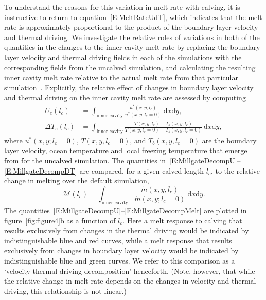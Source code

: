\documentclass[draft]{agujournal2019}
\begin{document}
To understand the reasons for this variation in melt rate with calving, it is instructive to return to equation~\eqref{E:MeltRateUdT}, which indicates that the melt rate is approximately proportional to the product of the boundary layer velocity and thermal driving. We investigate the relative roles of variations in both of the quantities in the changes to the inner cavity melt rate by replacing the boundary layer velocity and thermal driving fields in each of the simulations with the corresponding fields from the uncalved simulation, and calculating the resulting inner cavity melt rate relative to the actual melt rate from that particular simulation~\cite{Millgate2013JGROceans}. Explicitly, the relative effect of changes in boundary layer velocity and thermal driving on the inner cavity melt rate are assessed by computing
 \begin{align}
U_{e}(l_c) &=  \int_{\text{inner cavity}}\frac{u^*(x,y; l_c)}{u^*(x,y; l_c = 0)}~\mathrm{d}x\mathrm{d}y, \label{E:MillgateDecompU}\\ \Delta T_{e}(l_c) &= \int_{\text{inner cavity}}\frac{T(x,y; l_c) - T_b(x,y; l_c)}{T(x,y; l_c = 0) - T_{b}(x,y; l_c = 0)}~\mathrm{d}x\mathrm{d}y,\label{E:MillgateDecompDT}
 \end{align}
  where $u^*(x,y;l_c = 0)$, $T(x,y,l_c = 0)$, and $T_b(x,y,l_c = 0)$ are the boundary layer velocity, ocean temperature and local freezing temperature that emerge from for the uncalved simulation. The quantities in~\eqref{E:MillgateDecompU}--\eqref{E:MillgateDecompDT} are compared, for a given calved length $l_c$, to the relative change in melting over the default simulation,
 \begin{equation}\label{E:MillgateDecompMelt}
   \mathcal{M}(l_c) =  \int_{\text{inner cavity}}\frac{\dot{m}(x,y, l_c)}{\dot{m}(x,y; l_c = 0)}~\mathrm{d}x\mathrm{d}y.
 \end{equation}
The quantities~\eqref{E:MillgateDecompU}--\eqref{E:MillgateDecompMelt} are plotted in figure~\ref{fig:figure4}b as a function of $l_c$.  Here a melt response to calving that results exclusively from changes in the thermal driving would be indicated by indistinguishable blue and red curves, while a melt response that results exclusively from changes in boundary layer velocity would be indicated by indistinguishable blue and green curves. We refer to this comparison as a `velocity-thermal driving decomposition' henceforth. (Note, however, that while the relative change in melt rate depends on the changes in velocity and thermal driving, this relationship is not linear.) 
\end{document}
